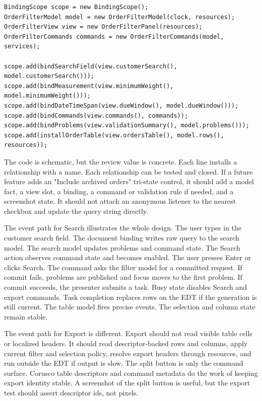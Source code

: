 \begin{lstlisting}[caption={A practical assembly reads as a sequence of owners.}]
BindingScope scope = new BindingScope();
OrderFilterModel model = new OrderFilterModel(clock, resources);
OrderFilterView view = new OrderFilterPanel(resources);
OrderFilterCommands commands = new OrderFilterCommands(model, services);

scope.add(bindSearchField(view.customerSearch(), model.customerSearch()));
scope.add(bindMeasurement(view.minimumWeight(), model.minimumWeight()));
scope.add(bindDateTimeSpan(view.dueWindow(), model.dueWindow()));
scope.add(bindCommands(view.commands(), commands));
scope.add(bindProblems(view.validationSummary(), model.problems()));
scope.add(installOrderTable(view.ordersTable(), model.rows(), resources));
\end{lstlisting}

The code is schematic, but the review value is concrete. Each line installs a
relationship with a name. Each relationship can be tested and closed. If a
future feature adds an "Include archived orders" tri-state control, it should
add a model fact, a view slot, a binding, a command or validation rule if
needed, and a screenshot state. It should not attach an anonymous listener to
the nearest checkbox and update the query string directly.

The event path for Search illustrates the whole design. The user types in the
customer search field. The document binding writes raw query to the search
model. The search model updates problems and command state. The Search action
observes command state and becomes enabled. The user presses Enter or clicks
Search. The command asks the filter model for a committed request. If commit
fails, problems are published and focus moves to the first problem. If commit
succeeds, the presenter submits a task. Busy state disables Search and export
commands. Task completion replaces rows on the EDT if the generation is still
current. The table model fires precise events. The selection and column state
remain stable.

The event path for Export is different. Export should not read visible table
cells or localized headers. It should read descriptor-backed rows and columns,
apply current filter and selection policy, resolve export headers through
resources, and run outside the EDT if output is slow. The split button is only
the command surface. Corusco table descriptors and command metadata do the
work of keeping export identity stable. A screenshot of the split button is
useful, but the export test should assert descriptor ids, not pixels.

